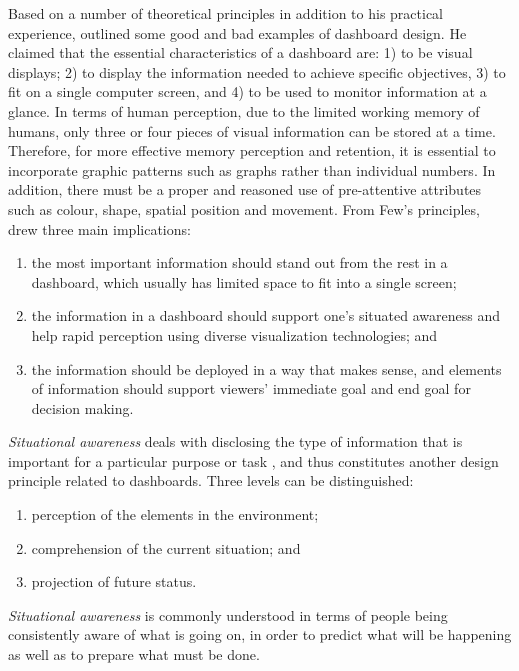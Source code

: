 \documentclass[preprint,12pt]{elsarticle}
\begin{document}
Based on a number of theoretical principles in addition to his practical experience, \citet{Few2013} outlined some good and bad examples of dashboard design. He claimed that the essential characteristics of a dashboard are: 
1) to be visual displays; 2) to display the information needed to achieve specific objectives, 3) to fit on a single computer screen, and 4) to be used to monitor information at a glance. 
In terms of human perception, due to the limited working memory of humans, only three or four pieces of visual information can be stored at a time.  Therefore, for more effective memory perception and retention, it is essential to incorporate graphic patterns such as graphs rather than individual numbers. In addition, there must be a proper and reasoned use of pre-attentive attributes such as colour, shape, spatial position and movement.
From Few's principles, \citet{Yoo2015} drew three main implications: 
\begin{enumerate}
	\item the most important information should stand out from the rest in a dashboard, which usually has limited space to fit into a single screen;
	\item the information in a dashboard should support one's situated awareness and help rapid perception using diverse visualization technologies; and
	\item the information should be deployed in a way that makes sense, and elements of information should support viewers' immediate goal and end goal for decision making.
\end{enumerate}

\textit{Situational awareness} deals with disclosing the type of information that is important for a particular purpose or task \citep{Endsley2016}, and thus constitutes another design principle related to dashboards. Three levels can be distinguished:
\begin{enumerate}
	\item perception of the elements in the environment;
	\item comprehension of the current situation; and
	\item projection of future status.
\end{enumerate}
\textit{Situational awareness} is commonly understood in terms of people being consistently aware of what is going on, in order to predict what will be happening as well as to prepare what must be done. 
\end{document}
